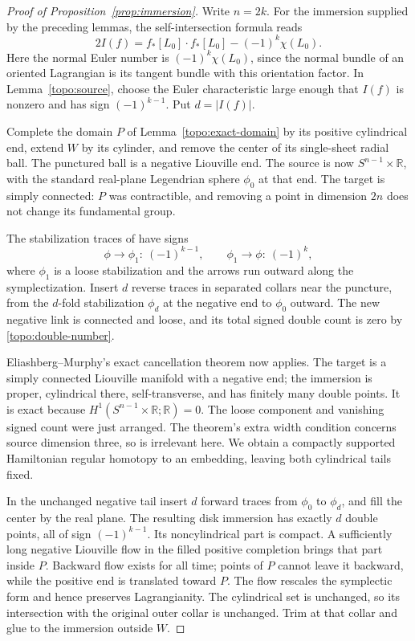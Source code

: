 \documentclass[11pt]{article}
\numberwithin{equation}{section}
\theoremstyle{definition}
\theoremstyle{remark}
\newcommand{\R}{\mathbb R}
\begin{document}
\begin{proof}[Proof of Proposition~\ref{prop:immersion}]
Write $n=2k$.  For the immersion supplied by the preceding lemmas,
the self-intersection formula reads
\begin{equation}\label{topo:double-number}
 2I(f)=f_*[L_0]\cdot f_*[L_0]-(-1)^k\chi(L_0).
\end{equation}
Here the normal Euler number is $(-1)^k\chi(L_0)$, since the
normal bundle of an oriented Lagrangian is its tangent bundle
with this orientation factor.  In Lemma~\ref{topo:source}, choose
the Euler characteristic large enough that $I(f)$ is nonzero
and has sign $(-1)^{k-1}$.  Put $d=|I(f)|$.

Complete the domain $P$ of Lemma~\ref{topo:exact-domain} by its
positive cylindrical end, extend $W$ by its cylinder, and remove
the center of its single-sheet radial ball.  The punctured ball
is a negative Liouville end.  The source is now
$S^{n-1}\times\R$, with the standard real-plane Legendrian
sphere $\phi_0$ at that end.  The target is simply connected:
$P$ was contractible, and removing a point in dimension $2n$
does not change its fundamental group.

The stabilization traces of
\cite[Lemma~3.2 and proof of Lemma~3.4]{EEMS} have signs
\begin{equation}\label{topo:trace-signs}
 \phi\longrightarrow\phi_1:\ (-1)^{k-1},
 \qquad
 \phi_1\longrightarrow\phi:\ (-1)^k,
\end{equation}
where $\phi_1$ is a loose stabilization and the arrows run
outward along the symplectization.  Insert $d$ reverse traces
in separated collars near the puncture, from the $d$-fold
stabilization $\phi_d$ at the negative end to $\phi_0$ outward.
The new negative link is connected and loose, and its total
signed double count is zero by \eqref{topo:double-number}.

Eliashberg--Murphy's exact cancellation theorem
\cite[Theorem~2.3]{EliashbergMurphyCaps} now applies.  The target
is a simply connected Liouville manifold with a negative end;
the immersion is proper, cylindrical there, self-transverse,
and has finitely many double points.  It is exact because
$H^1(S^{n-1}\times\R;\R)=0$.  The loose component and vanishing
signed count were just arranged.  The theorem's extra width
condition concerns source dimension three, so is irrelevant
here.  We obtain a compactly supported Hamiltonian regular
homotopy to an embedding, leaving both cylindrical tails fixed.

In the unchanged negative tail insert $d$ forward traces from
$\phi_0$ to $\phi_d$, and fill the center by the real plane.
The resulting disk immersion has exactly $d$ double points,
all of sign $(-1)^{k-1}$.  Its noncylindrical part is compact.
A sufficiently long negative Liouville flow in the filled
positive completion brings that part inside $P$.  Backward
flow exists for all time; points of $P$ cannot leave it
backward, while the positive end is translated toward $P$.
The flow rescales the symplectic form and hence preserves
Lagrangianity.  The cylindrical set is unchanged, so its
intersection with the original outer collar is unchanged.
Trim at that collar and glue to the immersion outside $W$.


\end{proof}
\end{document}
